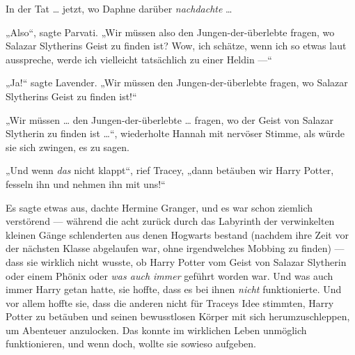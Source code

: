 In der Tat … jetzt, wo Daphne darüber \emph{nachdachte} …

„Also“, sagte Parvati.
„Wir müssen also den Jungen-der-überlebte fragen, wo Salazar Slytherins Geist zu finden ist? Wow, ich schätze, wenn ich so etwas laut ausspreche, werde ich vielleicht tatsächlich zu einer Heldin —“

„Ja!“ sagte Lavender.
„Wir müssen den Jungen-der-überlebte fragen, wo Salazar Slytherins Geist zu finden ist!“

„Wir müssen … den Jungen-der-überlebte … fragen, wo der Geist von Salazar Slytherin zu finden ist …“, wiederholte Hannah mit nervöser Stimme, als würde sie sich zwingen, es zu sagen.

„Und wenn \emph{das} nicht klappt“, rief Tracey, „dann betäuben wir Harry Potter, fesseln ihn und nehmen ihn mit uns!“

\later

Es sagte etwas aus, dachte Hermine Granger, und es war schon ziemlich verstörend — während die acht zurück durch das Labyrinth der verwinkelten kleinen Gänge schlenderten aus denen Hogwarts bestand (nachdem ihre Zeit vor der nächsten Klasse abgelaufen war, ohne irgendwelches Mobbing zu finden) — dass sie wirklich nicht wusste, ob Harry Potter vom Geist von Salazar Slytherin oder einem Phönix oder \emph{was auch immer} geführt worden war. Und was auch immer Harry getan hatte, sie hoffte, dass es bei ihnen \emph{nicht} funktionierte. Und vor allem hoffte sie, dass die anderen nicht für Traceys Idee stimmten, Harry Potter zu betäuben und seinen bewusstlosen Körper mit sich herumzuschleppen, um Abenteuer anzulocken. Das konnte im wirklichen Leben unmöglich funktionieren, und wenn doch, wollte sie sowieso aufgeben.

